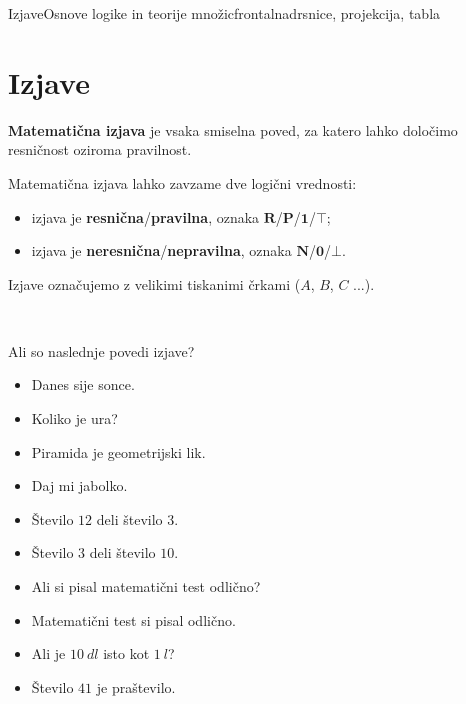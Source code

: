 \begin{priprava}{1}{}{Izjave}{Osnove logike in teorije množic}{frontalna}{drsnice, projekcija, tabla}


    \section{Izjave}

    \textbf{Matematična izjava} je vsaka smiselna poved, za katero 
    lahko določimo resničnost oziroma pravilnost.

     
    Matematična izjava lahko zavzame dve logični vrednosti:
    \begin{itemize}
        \item izjava je \textbf{resnična}/\textbf{pravilna}, 
            oznaka $\mathbf{R}$/$\mathbf{P}$/$\mathbf{1}$/$\mathbf{\top}$;
        \item izjava je \textbf{neresnična}/\textbf{nepravilna}, 
            oznaka $\mathbf{N}$/$\mathbf{0}$/$\mathbf{\bot }$.
    \end{itemize}                

     
    Izjave označujemo z velikimi tiskanimi črkami ($A$, $B$, $C$ ...).
 

    ~\\


 \begin{naloga}
    Ali so naslednje povedi izjave?
    \begin{itemize}   
        \item Danes sije sonce.
        \item Koliko je ura?
        \item Piramida je geometrijski lik.
        \item Daj mi jabolko.
        \item Število $12$ deli število $3$.
        \item Število $3$ deli število $10$.
        \item Ali si pisal matematični test odlično?
        \item Matematični test si pisal odlično.
        \item Ali je $10~dl$ isto kot $1~l$?
        \item Število $41$ je praštevilo.
    \end{itemize}
\end{naloga}
 




\end{priprava}

